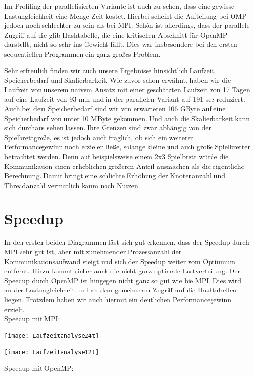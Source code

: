 \documentclass[
	12pt,
	a4paper,
	BCOR10mm,
	DIV14,
	listof=totoc,
	bibliography=totoc,
	headsepline
]{scrreprt}
\begin{document}
Im Profiling der parallelisierten Variante ist auch zu sehen, dass eine gewisse Lastungleichheit eine Menge Zeit kostet. Hierbei scheint die Aufteilung bei OMP jedoch noch schlechter zu sein als bei MPI. Schön ist allerdings, dass der parallele Zugriff auf die glib  Hashtabelle, die eine kritischen Abschnitt für OpenMP darstellt, nicht so sehr ins Gewicht fällt. Dies war insbesondere bei den ersten sequentiellen Programmen ein ganz großes Problem.
\newline

Sehr erfreulich finden wir auch unsere Ergebnisse hinsichtlich Laufzeit, Speicherbedarf und Skalierbarkeit. Wie zuvor schon erwähnt, haben wir die Laufzeit von unserem naivem Ansatz mit einer geschätzten Laufzeit von 17 Tagen auf eine Laufzeit von 93 min und in der parallelen Variant auf 191 sec reduziert. Auch bei dem Speicherbedarf sind wir von erwarteten 106 GByte auf eine Speicherbedarf von unter 10 MByte gekommen. 
Und auch die Skalierbarkeit kann sich durchaus sehen lassen. Ihre Grenzen sind zwar abhängig von der Spielbrettgröße, es ist jedoch auch fraglich, ob sich ein weiterer Performancegewinn noch erzielen ließe, solange kleine und auch große Spielbretter betrachtet werden. Denn auf beispielsweise einem 2x3 Spielbrett würde die Kommunikation einen erheblichen größeren Anteil ausmachen als die eigentliche Berechnung. Damit bringt eine schlichte Erhöhung der Knotenanzahl und Threadanzahl vermutlich kaum noch Nutzen.

\section{Speedup}

In den ersten beiden Diagrammen läst sich gut erkennen, dass der Speedup durch MPI sehr gut ist, aber mit zunehmender Prozessanzahl der Kommunikationsaufwand steigt und sich der Speedup weiter vom Optiumum entfernt. Hinzu kommt sicher auch die nicht ganz optimale Lastverteilung.
Der Speedup durch OpenMP ist hingegen nicht ganz so gut wie bie MPI. Dies wird an der Lastungleichheit und an dem gemeinseam Zugriff auf die Hashtabellen liegen. Trotzdem haben wir auch hiermit ein deutlichen Performancegewinn erzielt.\\

\pagebreak
Speedup mit MPI: 

\texttt{[image: Laufzeitanalyse24t]}

\texttt{[image: Laufzeitanalyse12t]}

\pagebreak
Speedup mit OpenMP:
\end{document}
